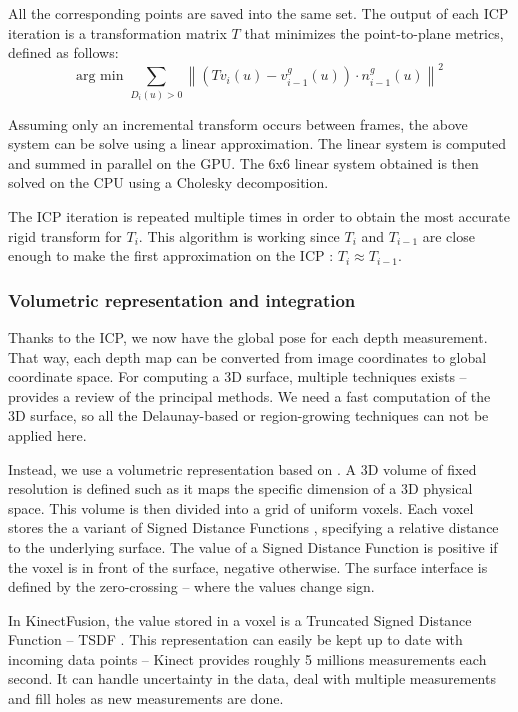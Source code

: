 \documentclass[12pt]{article}
\begin{document}
All the corresponding points are saved into the same set. The output of each ICP iteration is a transformation matrix $T$ that minimizes the point-to-plane metrics, defined as follows:
$$\text{arg min } \sum_{D_i(u)>0} \left\|(Tv_i(u)-v_{i-1}^g(u))\cdot n_{i-1}^g(u) \right\|^2$$

Assuming only an incremental transform occurs between frames, the above system can be solve using a linear approximation. The linear system is computed and summed in parallel on the GPU. The 6x6 linear system obtained is then solved on the CPU using a Cholesky decomposition.

The ICP iteration is repeated multiple times in order to obtain the most accurate rigid transform for $T_i$. This algorithm is working since $T_i$ and $T_{i-1}$ are close enough to make the first approximation on the ICP : $T_i \approx T_{i-1}$.

\subsubsection{Volumetric representation and integration}
Thanks to the ICP, we now have the global pose for each depth measurement. That way, each depth map can be converted from image coordinates to global coordinate space. For computing a 3D surface, multiple techniques exists -- \cite{ISO} provides a review of the principal methods. We need a fast computation of the 3D surface, so all the Delaunay-based or region-growing techniques can not be applied here.

Instead, we use a volumetric representation based on \cite{VolRep}. A 3D volume of fixed resolution is defined such as it maps the specific dimension of a 3D physical space. This volume is then divided into a grid of uniform voxels. Each voxel stores the a variant of Signed Distance Functions \cite{SDF}, specifying a relative distance to the underlying surface. The value of a Signed Distance Function is positive if the voxel is in front of the surface, negative otherwise. The surface interface is defined by the zero-crossing -- where the values change sign.

In KinectFusion, the value stored in a voxel is a Truncated Signed Distance Function -- TSDF \cite{VolRep}. This representation can easily be kept up to date with incoming data points -- Kinect provides roughly 5 millions measurements each second. It can handle uncertainty in the data, deal with multiple measurements and fill holes as new measurements are done.
\end{document}
